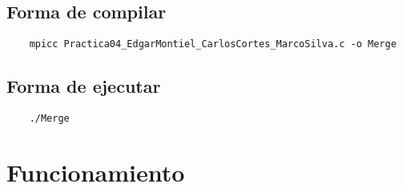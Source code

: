 \documentclass[a4paper,12pt]{article}
\begin{document}
\subsection*{Forma de compilar}
\begin{verbatim}
    mpicc Practica04_EdgarMontiel_CarlosCortes_MarcoSilva.c -o Merge
\end{verbatim}            

\subsection*{Forma de ejecutar}
\begin{verbatim}
    ./Merge
\end{verbatim}            


\section*{Funcionamiento}
\end{document}
